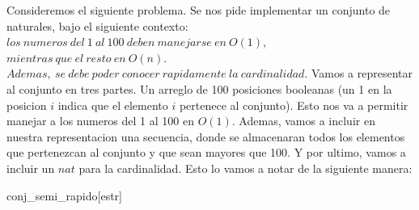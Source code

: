 \documentclass[10pt,a4paper]{article}
\begin{document}
\newline
\newline
Consideremos el siguiente problema. Se nos pide implementar un conjunto de naturales, bajo el siguiente contexto: $los~numeros~del~1~al~100~deben~manejarse~en~O(1)$, $mientras~que~el~resto~en~O(n)$. $Ademas,~se~debe~poder~conocer~rapidamente~la~cardinalidad$. Vamos a representar al conjunto en tres partes. Un arreglo de 100 posiciones booleanas (un 1 en la posicion $i$ indica que el elemento $i$ pertenece al conjunto). Esto nos va a permitir manejar a los numeros del 1 al 100 en $O(1)$. Ademas, vamos a incluir en nuestra representacion una secuencia, donde se almacenaran todos los elementos que pertenezcan al conjunto y que sean mayores que 100. Y por ultimo, vamos a incluir un $nat$ para la cardinalidad. Esto lo vamos a notar de la siguiente manera:
\newline
\begin{Estructura}{conj\_semi\_rapido}[estr]
	\begin{Tupla}[estr]%
	\end{Tupla}
\end{Estructura}
\end{document}

